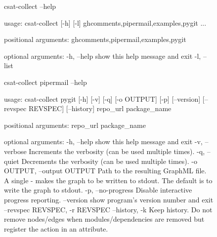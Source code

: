 \begin{figure}
\begin{userprompt}[caption={General help for the \texttt{csat-collect} command line utility.},label=lst:csat-help]
csat-collect --help
\end{userprompt}
\begin{cmdresult}
usage: csat-collect [-h] [-l] {ghcomments,pipermail,examples,pygit} ...

positional arguments:
  {ghcomments,pipermail,examples,pygit}

optional arguments:
  -h, --help            show this help message and exit
  -l, --list
\end{cmdresult}
\end{figure}

\begin{figure}
\begin{userprompt}[caption={Specific help for the \texttt{pygit} collector, as shown by the \texttt{csat-collect} command line utility.},label=lst:pygit-help]
csat-collect pipermail --help
\end{userprompt}
\begin{cmdresult}
usage: csat-collect pygit [-h] [-v] [-q] [-o OUTPUT] [-p] [--version]
                          [--revspec REVSPEC] [--history]
                          repo_url package_name

positional arguments:
  repo_url
  package_name

optional arguments:
  -h, --help            show this help message and exit
  -v, --verbose         Increments the verbosity (can be used multiple times).
  -q, --quiet           Decrements the verbosity (can be used multiple times).
  -o OUTPUT, --output OUTPUT
                        Path to the resulting GraphML file. A single - makes
                        the graph to be written to stdout. The default is to
                        write the graph to stdout.
  -p, --no-progress     Disable interactive progress reporting.
  --version             show program's version number and exit
  --revspec REVSPEC, -r REVSPEC
  --history, -k         Keep history. Do not remove nodes/edges when
                        modules/dependencies are removed but register the
                        action in an attribute.
\end{cmdresult}
\end{figure}

